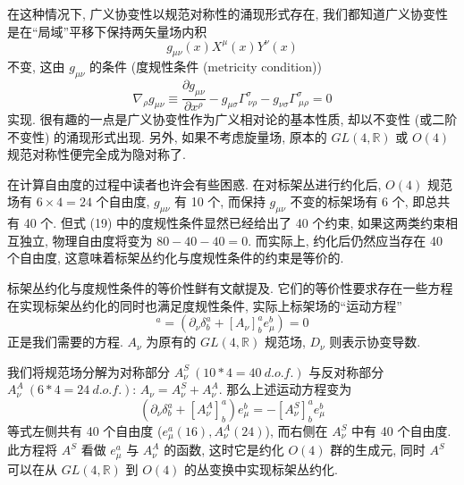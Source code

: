 \documentclass{article}
\begin{document}
 在这种情况下, 广义协变性以规范对称性的涌现形式存在, 我们都知道广义协变性是在``局域''平移下保持两矢量场内积
 \begin{equation}
 g_{\mu\nu}(x)X^{\mu}(x)Y^{\nu}(x)
 \end{equation}不变, 这由 $g_{\mu\nu}$ 的条件 (度规性条件 (metricity condition))
\begin{equation}
\nabla_{\rho}g_{\mu\nu}\equiv \frac{\partial g_{\mu\nu}}{\partial x^{\rho}}-g_{\mu\sigma}\Gamma_{\ \nu\rho}^{\sigma}-g_{\nu\sigma}\Gamma_{\ \mu\rho}^{\sigma}=0
\end{equation}
实现. 很有趣的一点是广义协变性作为广义相对论的基本性质, 却以不变性 (或二阶不变性) 的涌现形式出现. 另外, 如果不考虑旋量场, 原本的 $GL(4,\mathbb{R})$ 或 $O(4)$ 规范对称性便完全成为隐对称了.

在计算自由度的过程中读者也许会有些困惑. 在对标架丛进行约化后, $O(4)$ 规范场有 $6\times4=24$ 个自由度, $g_{\mu\nu}$ 有 10 个, 而保持 $g_{\mu\nu}$ 不变的标架场有 6 个, 即总共有 40 个. 但式 (19) 中的度规性条件显然已经给出了 40 个约束, 如果这两类约束相互独立, 物理自由度将变为 $80-40-40=0$. 而实际上, 约化后仍然应当存在 40 个自由度, 这意味着标架丛约化与度规性条件的约束是等价的.

标架丛约化与度规性条件的等价性鲜有文献提及. 它们的等价性要求存在一些方程在实现标架丛约化的同时也满足度规性条件, 实际上标架场的``运动方程''
\begin{equation}
[D_{\nu}e_{\mu}]^{a}=(\partial_{\nu}\delta_{b}^{a}+[A_{\nu}]^{a}_{b}e_{\mu}^{b})=0
\end{equation}
正是我们需要的方程. $A_{\nu}$ 为原有的 $GL(4,\mathbb{R})$ 规范场, $D_{\nu}$ 则表示协变导数.

我们将规范场分解为对称部分 $A_{\nu}^{S}\ (10*4=40\ d.o.f.)$ 与反对称部分 $A_{\nu}^{A}\ (6*4=24\ d.o.f.)$: $A_{\nu}=A_{\nu}^{S}+A_{\nu}^{A}$. 那么上述运动方程变为
\begin{equation}
(\partial_{\nu}\delta_{b}^{a}+[A_{\nu}^{A}]^{a}_{b})e_{\mu}^{b}=-[A_{\nu}^{S}]_{b}^{a}e_{\mu}^{b}
\end{equation}
等式左侧共有 40 个自由度 ($e_{\mu}^{a}(16),A_{\nu}^{A}(24)$), 而右侧在 $A_{\nu}^{S}$ 中有 40 个自由度. 此方程将 $A^{S}$ 看做 $e_{\mu}^{a}$ 与 $A_{\nu}^{A}$ 的函数, 这时它是约化 $O(4)$ 群的生成元, 同时 $A^{S}$ 可以在从 $GL(4,\mathbb{R})$ 到 $O(4)$ 的丛变换中实现标架丛约化.
\end{document}
